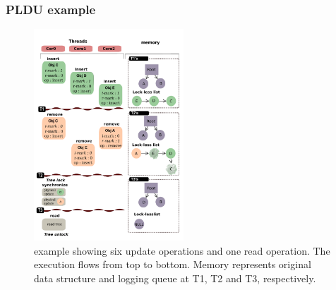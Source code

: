 \subsubsection{PLDU example}
%

\begin{figure}[tb]
  \begin{center}
     \includegraphics[width=0.5\textwidth,height=0.5\textheight,keepaspectratio]{fig/basic}
  \end{center}
  \caption{ example showing six update operations and one read
  operation. The execution flows from top to bottom. Memory represents original
  data structure and logging queue at T1, T2 and T3, respectively.}
  \label{fig:basic}
\end{figure}


